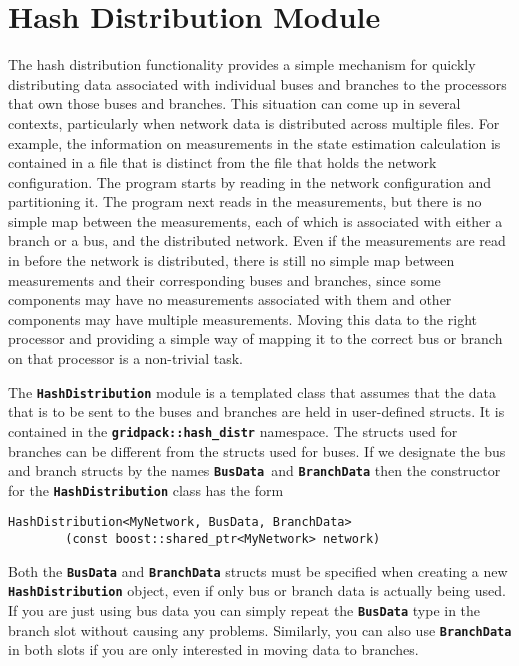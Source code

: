 \section{Hash Distribution Module}

The hash distribution functionality provides a simple mechanism for quickly distributing data associated with individual buses and branches to the processors that own those buses and branches. This situation can come up in several contexts, particularly when network data is distributed across multiple files. For example, the information on measurements in the state estimation calculation is contained in a file that is distinct from the file that holds the network configuration. The program starts by reading in the network configuration and partitioning it. The program next reads in the measurements, but there is no simple map between the measurements, each of which is associated with either a branch or a bus, and the distributed network. Even if the measurements are read in before the network is distributed, there is still no simple map between measurements and their corresponding buses and branches, since some components may have no measurements associated with them and other components may have multiple measurements. Moving this data to the right processor and providing a simple way of mapping it to the correct bus or branch on that processor is a non-trivial task.

The \texttt{\textbf{HashDistribution}} module is a templated class that assumes that the data that is to be sent to the buses and branches are held in user-defined structs. It is contained in the \texttt{\textbf{gridpack::hash\_distr}} namespace. The structs used for branches can be different from the structs used for buses. If we designate the bus and branch structs by the names \texttt{\textbf{BusData }}and \texttt{\textbf{BranchData}} then the constructor for the \texttt{\textbf{HashDistribution}} class has the form

{
\color{red}
\begin{Verbatim}[fontseries=b]
HashDistribution<MyNetwork, BusData, BranchData>
        (const boost::shared_ptr<MyNetwork> network)
\end{Verbatim}
}

Both the \texttt{\textbf{BusData}} and \texttt{\textbf{BranchData}} structs must be specified when creating a new \texttt{\textbf{HashDistribution}} object, even if only bus or branch data is actually being used. If you are just using bus data you can simply repeat the \texttt{\textbf{BusData}} type in the branch slot without causing any problems. Similarly, you can also use \texttt{\textbf{BranchData}} in both slots if you are only interested in moving data to branches.

